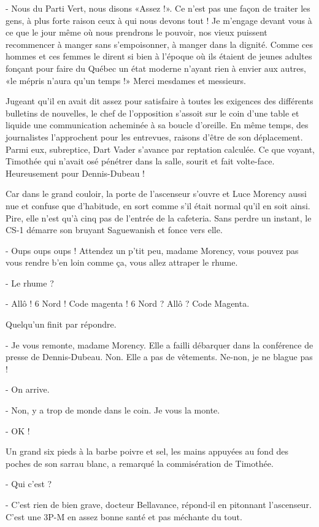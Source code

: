 - Nous du Parti Vert, nous disons «Assez !». Ce n’est pas une façon de traiter les gens, à plus forte raison ceux à qui nous devons tout ! Je m’engage devant vous à ce que le jour même où nous prendrons le pouvoir, nos vieux puissent recommencer à manger sans s’empoisonner, à manger dans la dignité. Comme ces hommes et ces femmes le dirent si bien à l’époque où ils étaient de jeunes adultes fonçant pour faire du Québec un état moderne n’ayant rien à envier aux autres, «le mépris n’aura qu’un temps !» Merci mesdames et messieurs.

Jugeant qu’il en avait dit assez pour satisfaire à toutes les exigences des différents bulletins de nouvelles, le chef de l’opposition s’assoit sur le coin d’une table et liquide une communication acheminée à sa boucle d’oreille. En même temps, des journalistes l’approchent pour les entrevues, raisons d’être de son déplacement. Parmi eux, subreptice, Dart Vader s’avance par reptation calculée. Ce que voyant, Timothée qui n’avait osé pénétrer dans la salle, sourit et fait volte-face. Heureusement pour Dennis-Dubeau !

Car dans le grand couloir, la porte de l’ascenseur s’ouvre et Luce Morency aussi nue et confuse que d’habitude, en sort comme s’il était normal qu’il en soit ainsi. Pire, elle n’est qu’à cinq pas de l’entrée de la cafeteria. Sans perdre un instant, le CS-1 démarre son bruyant Saguewanish et fonce vers elle.

- Oups oups oups ! Attendez un p’tit peu, madame Morency, vous pouvez pas vous rendre b’en loin comme ça, vous allez attraper le rhume.

- Le rhume ?

- Allô ! 6 Nord ! Code magenta ! 6 Nord ? Allô ? Code Magenta.

Quelqu’un finit par répondre.

- Je vous remonte, madame Morency. Elle a failli débarquer dans la conférence de presse de Dennis-Dubeau. Non. Elle a pas de vêtements. Ne-non, je ne blague pas !

- On arrive.

- Non, y a trop de monde dans le coin. Je vous la monte.

- OK !

Un grand six pieds à la barbe poivre et sel, les mains appuyées au fond des poches de son sarrau blanc, a remarqué la commisération de Timothée.

- Qui c’est ?

- C’est rien de bien grave, docteur Bellavance, répond-il en pitonnant l’ascenseur. C’est une 3P-M en assez bonne santé et pas méchante du tout.

